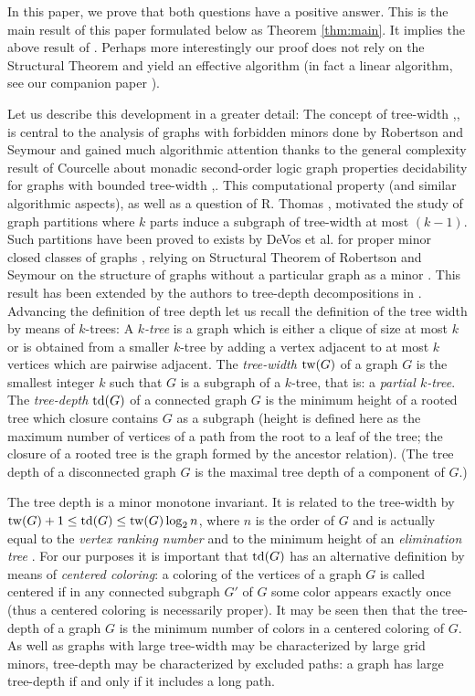 \documentclass[a4paper]{amsart}
\theoremstyle{definition}
\theoremstyle{remark}
\DeclareMathOperator\depth{{\rm td}}
\DeclareMathOperator\tw{{\rm tw}}
\begin{document}
In this paper, we prove that  both questions have a  
positive answer. This is the main result of this paper formulated below 
as Theorem \ref{thm:main}. 
It implies the above result of \cite{Taxi_tdepth}. 
Perhaps more interestingly our proof does not rely on the Structural Theorem and yield an effective
algorithm (in fact a linear algorithm, see our companion paper \cite{POMNII}).

Let us describe this development in a greater detail:
The concept of tree-width \cite{Halin},\cite{GM1},\cite{Wagner} is
central to the analysis of graphs with forbidden minors done by
Robertson and Seymour and gained much algorithmic attention
thanks to the general complexity result of Courcelle about
monadic second-order logic graph properties decidability for graphs
with bounded tree-width \cite{Courcelle1},\cite{Courcelle2}.
This computational property (and similar algorithmic aspects), as well
as a question of R. Thomas \cite{2twconj},
motivated the study of graph partitions where $k$ parts induce a
subgraph of tree-width at most $(k-1)$. Such partitions have been proved
to exists by DeVos et al. for proper minor closed classes of graphs
\cite{2tw}, relying on Structural Theorem of Robertson and Seymour on
the structure of graphs without a particular graph as a minor \cite{GM16}. 
This result has been extended by the authors to tree-depth
decompositions in \cite{Taxi_tdepth}. Advancing the definition of 
tree depth let us recall the definition of the tree width by means of 
$k$-trees: A {\em $k$-tree} is a graph which is either a clique of size at most
$k$ or is obtained from a smaller $k$-tree by adding a vertex adjacent
to at most $k$ vertices which are pairwise adjacent. The {\em
tree-width} $\tw(G)$ of a graph $G$ is the smallest integer $k$ such that $G$
is a subgraph of a $k$-tree, that is: a {\em partial $k$-tree}.
The {\em tree-depth} $\depth(G)$ of a connected  graph $G$ is the minimum height
of a rooted tree which closure contains $G$ as a subgraph (height is
defined here as the maximum number of vertices of a path from the root
to a leaf of the tree; the closure of a rooted tree is the graph formed 
by the ancestor relation). (The tree depth of a disconnected graph $G$ is 
the maximal
tree depth of a component of $G$.)

The tree depth is a  minor monotone invariant. It  is related to
the tree-width by $\tw(G)+1\leq\depth(G)\leq\tw(G)\log_2 n$, where $n$ is
the order of $G$ and is actually equal to the {\em vertex ranking
number} \cite{vertex_ranking}\cite{Schaffer} and to the minimum height
of an {\em elimination tree}  \cite{vertex_ranking}. For our purposes it is 
important that $\depth(G)$ has an  alternative
definition by means of  {\em centered coloring}: a  coloring of the vertices
of a graph $G$ is called centered if in any connected subgraph $G'$ of
$G$ some color appears exactly
once (thus a centered coloring is necessarily proper).
It may be seen then that the tree-depth of a graph $G$ is the minimum 
number of colors in a
centered coloring of $G$. As well as graphs with large tree-width 
may be characterized by large  grid minors,
tree-depth may be characterized by excluded paths: a graph has large
tree-depth if and only if it includes a long path. 
\end{document}
